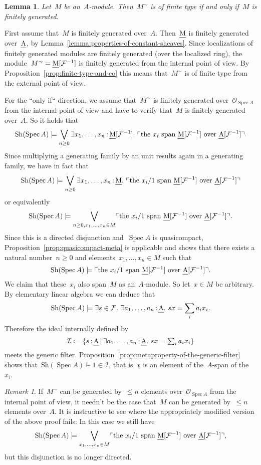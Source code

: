 \documentclass[10pt,reqno,a4paper]{amsbook}
\makeatletter
\theoremstyle{definition}
\theoremstyle{plain}
\newtheorem{lemma}[defn]{Lemma}
\theoremstyle{remark}
\newtheorem{rem}[defn]{Remark}
\newcommand{\F}{\mathcal{F}}
\renewcommand{\O}{\mathcal{O}}
\newcommand{\I}{\mathcal{I}}
\let\oldul\ul
\renewcommand{\ul}[1]{\text{\oldul{$#1$}}}
\newcommand{\Sh}{\mathrm{Sh}}
\DeclareMathOperator{\Spec}{Spec}
\newcommand{\?}{\,{:}\,}
\renewcommand{\_}{\mathpunct{.}\,}
\newcommand{\speak}[1]{\ulcorner\text{\textnormal{#1}}\urcorner}
\newcommand{\defeq}{\vcentcolon=}
\renewenvironment{proof}[1][\proofname]{\par
  \pushQED{\qed}%
  \normalfont \topsep6\p@\@plus6\p@\relax
  \trivlist
  \item[\hskip\labelsep
        \itshape
    #1\@addpunct{.}]\ignorespaces
}{%
  \popQED\endtrivlist\@endpefalse
}
\makeatother
\begin{document}
\begin{lemma}Let~$M$ be an~$A$-module. Then~$M^\sim$ is of finite type if and
only if~$M$ is finitely generated.\end{lemma}
\begin{proof}First assume that~$M$ is finitely generated over~$A$.
Then~$\ul{M}$ is finitely generated over~$\ul{A}$, by
Lemma~\ref{lemma:properties-of-constant-sheaves}. Since localizations of
finitely generated modules are finitely generated (over the localized ring),
the module~$M^\sim = \ul{M}[\F^{-1}]$ is finitely generated from the internal
point of view. By Proposition~\ref{prop:finite-type-and-co} this means
that~$M^\sim$ is of finite type from the external point of view.

For the ``only if`` direction, we assume that~$M^\sim$ is finitely generated
over~$\O_{\Spec A}$ from the internal point of view and have to verify that~$M$
is finitely generated over~$A$. So it holds that
\[ \Sh(\Spec A) \models \bigvee_{n \geq 0}
  \exists x_1,\ldots,x_n\?\ul{M}[\F^{-1}]\_
  \speak{the $x_i$ span~$\ul{M}[\F^{-1}]$ over~$\ul{A}[\F^{-1}]$}. \]
Since multiplying a generating family by an unit results again in a generating
family, we have in fact that
\[ \Sh(\Spec A) \models \bigvee_{n \geq 0}
  \exists x_1,\ldots,x_n\?\ul{M}\_
  \speak{the $x_i/1$ span~$\ul{M}[\F^{-1}]$ over~$\ul{A}[\F^{-1}]$} \]
or equivalently
\[ \Sh(\Spec A) \models \bigvee_{n \geq 0, x_1,\ldots,x_n \in M}
  \speak{the $x_i/1$ span~$\ul{M}[\F^{-1}]$ over~$\ul{A}[\F^{-1}]$}. \]
Since this is a directed disjunction and~$\Spec A$ is quasicompact,
Proposition~\ref{prop:quasicompact-meta} is applicable and shows that there
exists a natural number~$n \geq 0$ and elements~$x_1,\ldots,x_n \in M$ such
that
\[ \Sh(\Spec A) \models \speak{the $x_i/1$ span~$\ul{M}[\F^{-1}]$
over~$\ul{A}[\F^{-1}]$}. \]
We claim that these~$x_i$ also span~$M$ as an~$A$-module. So let~$x \in M$ be
arbitrary. By elementary linear algebra we can deduce that
\[ \Sh(\Spec A) \models \exists s\in\F\_ \exists a_1,\ldots,a_n\?\ul{A}\_
  sx = \sum_i a_i x_i. \]
Therefore the ideal internally defined by
\[ \I \defeq \{ s\?\ul{A} \,|\, \exists a_1,\ldots,a_n\?\ul{A}\_
  sx = \textstyle\sum_i a_i x_i \} \]
meets the generic filter.
Proposition~\ref{prop:metaproperty-of-the-generic-filter} shows that~$\Sh(\Spec A)
\models 1 \in \I$, that is~$x$ is an element of the~$A$-span of the~$x_i$.
\end{proof}

\begin{rem}If~$M^\sim$ can be generated by~$\leq n$ elements over~$\O_{\Spec
A}$ from the internal point of view, it needn't be the case that~$M$ can be
generated by~$\leq n$ elements over~$A$. It is instructive to see where the
appropriately modified version of the above proof fails: In this case we still
have
\[ \Sh(\Spec A) \models \bigvee_{x_1,\ldots,x_n \in M}
  \speak{the $x_i/1$ span~$\ul{M}[\F^{-1}]$ over~$\ul{A}[\F^{-1}]$}, \]
but this disjunction is no longer directed.
\end{rem}
\end{document}
